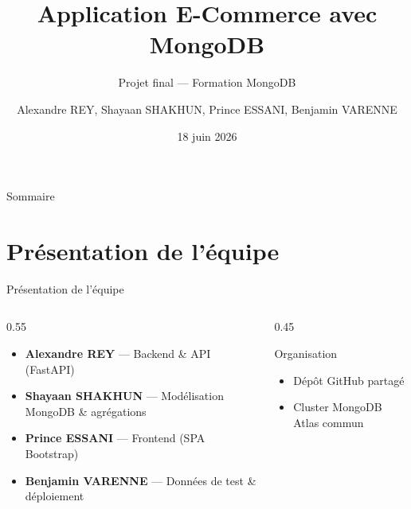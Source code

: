 \documentclass[aspectratio=169]{beamer}
\title[E-Commerce MongoDB]{Application E-Commerce avec MongoDB}
\subtitle{Projet final — Formation MongoDB}
\author{Alexandre REY, Shayaan SHAKHUN, Prince ESSANI, Benjamin VARENNE}
\date{18 juin 2026}
\begin{document}
\begin{frame}\titlepage\end{frame}

\begin{frame}{Sommaire}\tableofcontents\end{frame}

\section{Présentation de l'équipe}
\begin{frame}{Présentation de l'équipe}
  \begin{columns}
    \begin{column}{0.55\textwidth}
      \begin{itemize}
        \item \textbf{Alexandre REY} — Backend \& API (FastAPI)
        \item \textbf{Shayaan SHAKHUN} — Modélisation MongoDB \& agrégations
        \item \textbf{Prince ESSANI} — Frontend (SPA Bootstrap)
        \item \textbf{Benjamin VARENNE} — Données de test \& déploiement
      \end{itemize}
      \vspace{1em}
      
    \end{column}
    \begin{column}{0.45\textwidth}
      \begin{block}{Organisation}
        \begin{itemize}
          \item Dépôt GitHub partagé
          \item Cluster MongoDB Atlas commun
          
        \end{itemize}
      \end{block}
    \end{column}
  \end{columns}
\end{frame}

\end{document}
